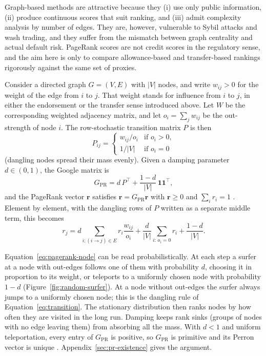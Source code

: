 Graph-based methods are attractive because they (i) use only public information, (ii) produce continuous scores that suit ranking, and (iii) admit complexity analysis by number of edges. They are, however, vulnerable to Sybil attacks  and wash trading, and they suffer from the mismatch between graph centrality and actual default risk. PageRank scores are not credit scores in the regulatory sense, and the aim here is only to compare allowance-based and transfer-based rankings rigorously against the same set of proxies.


Consider a directed graph $G=(V,E)$ with $|V|$ nodes, and write $w_{ij}>0$ for the weight of the edge from $i$ to $j$. That weight stands for influence from $i$ to $j$, in either the endorsement or the transfer sense introduced above. Let $W$ be the corresponding weighted adjacency matrix, and let $o_i=\sum_j w_{ij}$ be the out-strength of node $i$. The row-stochastic transition matrix $P$ is then
\begin{equation}
P_{ij} =
\begin{cases}
w_{ij}/o_i & \text{if } o_i>0,\\
1/|V| & \text{if } o_i=0
\end{cases}
\label{eq:transition}
\end{equation}
(dangling nodes spread their mass evenly). Given a damping parameter $d\in(0,1)$, the Google matrix is
\begin{equation}
G_{\mathrm{PR}} = d\, P^{\top} + \frac{1-d}{|V|}\,\mathbf{1}\mathbf{1}^{\top},
\label{eq:google-matrix}
\end{equation}
and the PageRank vector $\mathbf{r}$ satisfies $\mathbf{r}=G_{\mathrm{PR}}\mathbf{r}$ with $\mathbf{r}\geq 0$ and $\sum_i r_i=1$ . Element by element, with the dangling rows of $P$ written as a separate middle term, this becomes
\begin{equation}
r_j = d\sum_{i:(i\to j)\in E} r_i \frac{w_{ij}}{o_i} + \frac{d}{|V|}\sum_{i:\,o_i=0} r_i + \frac{1-d}{|V|}.
\label{eq:pagerank-node}
\end{equation}


Equation~\eqref{eq:pagerank-node} can be read probabilistically. At each step a surfer at a node with out-edges follows one of them with probability $d$, choosing it in proportion to its weight, or teleports to a uniformly chosen node with probability $1-d$ (Figure~\ref{fig:random-surfer}). At a node without out-edges the surfer always jumps to a uniformly chosen node; this is the dangling rule of Equation~\eqref{eq:transition}. The stationary distribution then ranks nodes by how often they are visited in the long run. Damping keeps rank sinks (groups of nodes with no edge leaving them) from absorbing all the mass. With $d<1$ and uniform teleportation, every entry of $G_{\mathrm{PR}}$ is positive, so $G_{\mathrm{PR}}$ is primitive and its Perron vector is unique . Appendix~\ref{sec:pr-existence} gives the argument.

